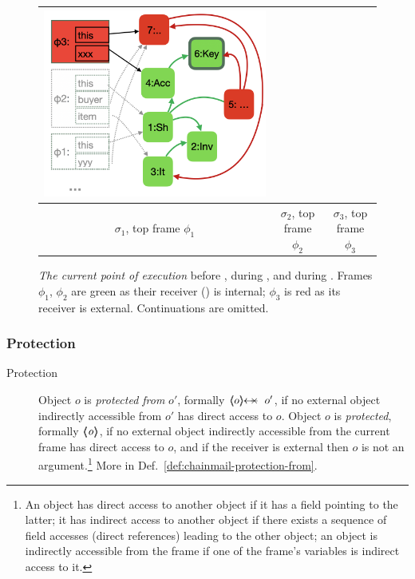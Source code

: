 \begin{figure}[th]
\begin{tabular}{|c|c|c|}
{\includegraphics[width=\linewidth]{diagrams/ShopD.png}
}
\\
\hline
$\sigma_1$, top frame $\phi_1$  %
&
$\sigma_2$, top frame $\phi_2$ 
&
$\sigma_3$, top frame $\phi_3$ 
\\
\hline %
\end{tabular}
\caption{\textit{The current point of execution} before , during , and during .  Frames $\phi_1$, $\phi_2$ are green  as their receiver () is internal;  $\phi_3$ is red as its receiver is external. Continuations are omitted.}
 \label{f:CurrentPoint}
 \end{figure}


\subsubsection{Protection}
\label{sect:approach:protection}


 \begin{description}
\item[Protection] 
Object $o$ is \emph{protected  from} $o'$, formally $\protectedFrom {o} {o'}$,  
if no external object indirectly accessible from $o'$ has direct access to $o$.
Object $o$ is \emph{protected}, formally ${\langle\!\!\langle \mbox{\normalfont{\texttt{\it{o}}}} \rangle\!\!\rangle}$,  
if no external object indirectly accessible from the current frame has direct access to $o$,
 and  if the receiver is external then $o$ is not an argument.\footnote{An object has direct access to another object if it has a field pointing to the latter;
 it has indirect access to another object if there exists a sequence of field accesses (direct references) leading to the other object; 
 an object is indirectly accessible from the frame if one of the frame's variables is indirect access to it.} 
 More in Def.\ \ref{def:chainmail-protection-from}. %
\end{description}
 
